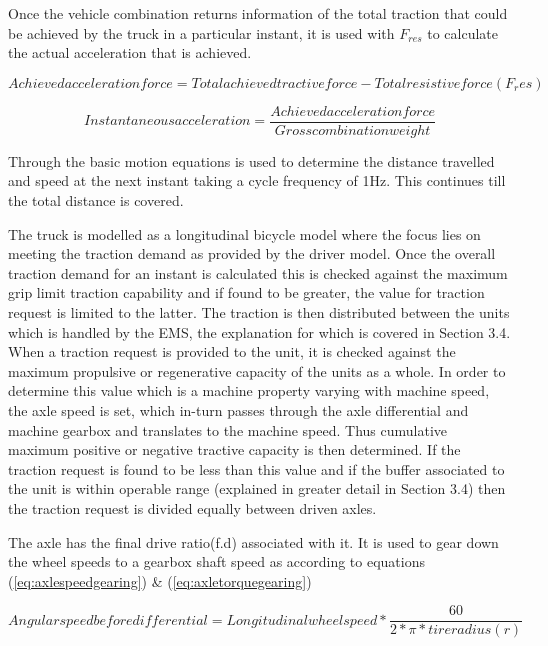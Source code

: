 \documentclass[ExampleMasters.tex]{subfiles}
\begin{document}
Once the vehicle combination returns information of the total traction that could be achieved by the truck in a particular instant, it is used with $F_{res}$ to calculate the actual acceleration that is achieved.
 
\begin{equation} \label{eq:acclforce}
Achieved acceleration force=Total achieved tractive force-Total resistive force(F_res)
\end{equation} 

\begin{equation} \label{eq:acclinstant}
Instantaneous acceleration=\frac{Achieved acceleration force}{Gross combination weight}
\end{equation} 

Through the basic motion equations is used to determine the distance travelled and speed at the next instant taking a cycle frequency of 1Hz. This continues till the total distance is covered. 

The truck is modelled as a longitudinal bicycle model where the focus lies on meeting the traction demand as provided by the driver model. Once the overall traction demand for an instant is calculated this is checked against the maximum grip limit traction capability and if found to be greater, the value for traction request is limited to the latter. The traction is then distributed between the units which is handled by the EMS, the explanation for which is covered in Section 3.4. When a traction request is provided to the unit, it is checked against the maximum propulsive or regenerative capacity of the units as a whole. In order to determine this value which is a machine property varying with machine speed, the axle speed is set, which in-turn passes through the axle differential and machine gearbox and translates to the machine speed. Thus cumulative maximum positive or negative tractive capacity is then determined. If the traction request is found to be less than this value and if the buffer associated to the unit is within operable range (explained in greater detail in Section 3.4) then the traction request is divided equally between driven axles.

The axle has the final drive ratio(f.d) associated with it. It is used to gear down the wheel speeds to a gearbox shaft speed as according to equations (\ref{eq:axlespeedgearing}) \&  (\ref{eq:axletorquegearing})

\begin{equation} \label{eq:axlespeedgearing}
Angular speed before differential =Longitudinal wheel speed*\frac{60}{2*\pi*tire radius(r)}
\end{equation}
\end{document}
